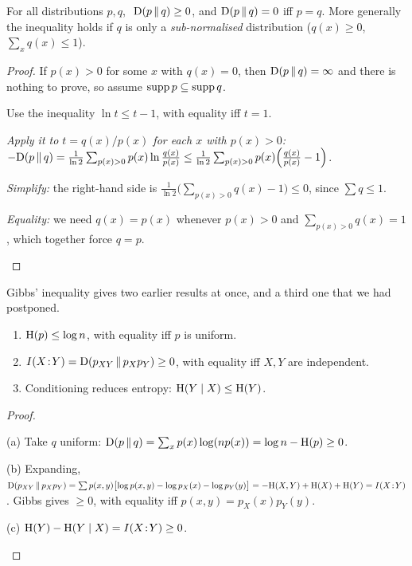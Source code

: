 \begin{theorem}\label{thm:gibbs}
  For all distributions $p,q$, $\ \mathrm{D}\!\left(p\,\middle\|\,q\right)\ge0$, and $\mathrm{D}\!\left(p\,\middle\|\,q\right)=0$ iff $p=q$. More generally the inequality holds if $q$ is only a \emph{sub-normalised} distribution ($q(x)\ge0$, $\sum_xq(x)\le1$).
\end{theorem}
\begin{proof}
  If $p(x)>0$ for some $x$ with $q(x)=0$, then $\mathrm{D}\!\left(p\,\middle\|\,q\right)=\infty$ and there is nothing to prove, so assume $\operatorname{supp} p\subseteq\operatorname{supp} q$.
  \begin{steps}
    \item Use the inequality $\ln t\le t-1$, with equality iff $t=1$.
    \item \emph{Apply it to $t=q(x)/p(x)$ for each $x$ with $p(x)>0$:} $-\mathrm{D}\!\left(p\,\middle\|\,q\right)=\frac1{\ln2}\sum_{p(x)>0}p(x)\ln\frac{q(x)}{p(x)}\le\frac1{\ln2}\sum_{p(x)>0}p(x)\Bigl(\frac{q(x)}{p(x)}-1\Bigr)$.
    \item \emph{Simplify:} the right-hand side is $\frac1{\ln2}\bigl(\sum_{p(x)>0}q(x)-1\bigr)\le0$, since $\sum q\le1$.
    \item \emph{Equality:} we need $q(x)=p(x)$ whenever $p(x)>0$ and $\sum_{p(x)>0}q(x)=1$, which together force $q=p$. \qedhere
  \end{steps}
\end{proof}

Gibbs' inequality gives two earlier results at once, and a third one that we had postponed.

\begin{corollary}\label{cor:gibbs-consequences}
  \begin{enumerate}
    \item[(a)] $\mathrm{H}(p)\le\log n$, with equality iff $p$ is uniform.
    \item[(b)] $I(X\!:\!Y)=\mathrm{D}\!\left(p_{XY}\,\middle\|\,p_Xp_Y\right)\ge0$, with equality iff $X,Y$ are independent.
    \item[(c)] Conditioning reduces entropy: $\mathrm{H}(Y\mid X)\le\mathrm{H}(Y)$.
  \end{enumerate}
\end{corollary}
\begin{proof}
  \begin{steps}
    \item (a) Take $q$ uniform: $\mathrm{D}\!\left(p\,\middle\|\,q\right)=\sum_xp(x)\log(np(x))=\log n-\mathrm{H}(p)\ge0$.
    \item (b) Expanding, $\mathrm{D}\!\left(p_{XY}\,\middle\|\,p_Xp_Y\right)=\sum p(x,y)\bigl[\log p(x,y)-\log p_X(x)-\log p_Y(y)\bigr]=-\mathrm{H}(X,Y)+\mathrm{H}(X)+\mathrm{H}(Y)=I(X\!:\!Y)$. Gibbs gives $\ge0$, with equality iff $p(x,y)=p_X(x)p_Y(y)$.
    \item (c) $\mathrm{H}(Y)-\mathrm{H}(Y\mid X)=I(X\!:\!Y)\ge0$. \qedhere
  \end{steps}
\end{proof}

